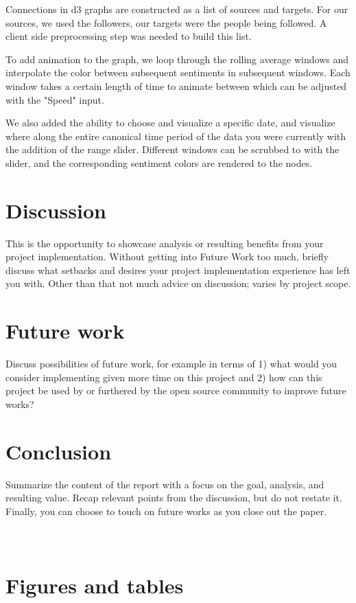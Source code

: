 \documentclass[12pt]{article}
\begin{document}
Connections in d3 graphs are constructed as a list of sources and targets. For our sources, we used the followers, our targets 
were the people being followed. A client side preprocessing step was needed to build this list.

To add animation to the graph, we loop through the rolling average windows and interpolate the color between subsequent sentiments
in subsequent windows. Each window takes a certain length of time to animate between which can be adjusted with the "Speed" input.

We also added the ability to choose and visualize a specific date, and visualize where along the entire canonical time period of the data
you were currently with the addition of the range slider. Different windows can be scrubbed to with the slider, and the corresponding
sentiment colors are rendered to the nodes.


\section{Discussion}
This is the opportunity to showcase analysis or resulting benefits from your project implementation. Without getting into Future Work too much, briefly discuss what setbacks and desires your project implementation experience has left you with. Other than that not much advice on discussion; varies by project scope. 


\section{Future work}
Discuss possibilities of future work, for example in terms of 1) what would you consider implementing given more time on this project and 2) how can this project be used by or furthered by the open source community to improve future works?


\section{Conclusion}
Summarize the content of the report with a focus on the goal, analysis, and resulting value. Recap relevant points from the discussion, but do not restate it. Finally, you can choose to touch on future works as you close out the paper.

\appendix
\section{\\Figures and tables}
\end{document}
